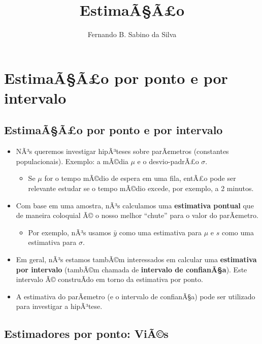 \documentclass[]{article}
\title{EstimaÃ§Ã£o}
\author{Fernando B. Sabino da Silva}
\date{}
\providecommand{\tightlist}{%
  \setlength{\itemsep}{0pt}\setlength{\parskip}{0pt}}
\begin{document}
\maketitle

{
\setcounter{tocdepth}{2}
\tableofcontents
}
\section{EstimaÃ§Ã£o por ponto e por
intervalo}\label{estimaaao-por-ponto-e-por-intervalo}

\subsection{EstimaÃ§Ã£o por ponto e por
intervalo}\label{estimaaao-por-ponto-e-por-intervalo-1}

\begin{itemize}
\item
  NÃ³s queremos investigar hipÃ³teses sobre parÃ¢metros (constantes
  populacionais). Exemplo: a mÃ©dia \(\mu\) e o desvio-padrÃ£o
  \(\sigma\).

  \begin{itemize}
  \tightlist
  \item
    Se \(\mu\) for o tempo mÃ©dio de espera em uma fila, entÃ£o pode ser
    relevante estudar se o tempo mÃ©dio excede, por exemplo, a 2
    minutos.
  \end{itemize}
\item
  Com base em uma amostra, nÃ³s calculamos uma \textbf{estimativa
  pontual} que de maneira coloquial Ã© o nosso melhor ``chute'' para o
  valor do parÃ¢metro.

  \begin{itemize}
  \tightlist
  \item
    Por exemplo, nÃ³s usamos \(\bar{y}\) como uma estimativa para
    \(\mu\) e \(s\) como uma estimativa para \(\sigma\).
  \end{itemize}
\item
  Em geral, nÃ³s estamos tambÃ©m interessados em calcular uma
  \textbf{estimativa por intervalo} (tambÃ©m chamada de
  \textbf{intervalo de confianÃ§a}). Este intervalo Ã© construÃ­do em
  torno da estimativa por ponto.
\item
  A estimativa do parÃ¢metro (e o intervalo de confianÃ§a) pode ser
  utilizado para investigar a hipÃ³tese.
\end{itemize}

\subsection{Estimadores por ponto:
ViÃ©s}\label{estimadores-por-ponto-vias}
\end{document}
